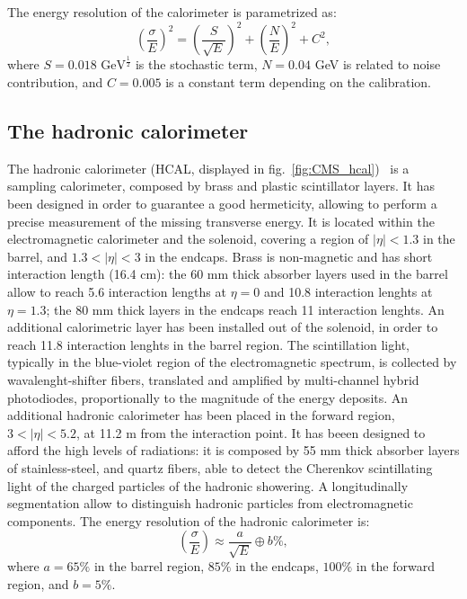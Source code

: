 \noindent The energy resolution of the calorimeter is parametrized as:
\begin{equation}
{\left( \frac{\sigma}{E} \right)}^2 = {\left( \frac{S}{\sqrt{E}} \right)}^2 + {\left( \frac{N}{E} \right)}^2 + C^2,
\end{equation}
where $S=0.018 \text{ GeV}^{\frac{1}{2}}$ is the stochastic term, $N=0.04$ GeV is related to noise contribution, and $C=0.005$ is a constant term depending on the calibration.


\subsection{The hadronic calorimeter}
The hadronic calorimeter (HCAL, displayed in fig.~\ref{fig:CMS_hcal})~\cite{HCAL-TDR} is a sampling calorimeter, composed by brass and plastic scintillator layers. It has been designed in order to guarantee a good hermeticity, allowing to perform a precise measurement of the missing transverse energy. It is located within the electromagnetic calorimeter and the solenoid, covering a region of $|\eta|<1.3$ in the barrel, and $1.3<|\eta|<3$ in the endcaps. Brass is non-magnetic and has short interaction length (16.4 cm): the 60 mm thick absorber layers used in the barrel allow to reach 5.6 interaction lengths at $\eta=0$ and 10.8 interaction lenghts at $\eta = 1.3$; the 80 mm thick layers in the endcaps reach 11 interaction lenghts. An additional calorimetric layer has been installed out of the solenoid, in order to reach 11.8 interaction lenghts in the barrel region. The scintillation light, typically in the blue-violet region of the electromagnetic spectrum, is collected by wavalenght-shifter fibers, translated and amplified by multi-channel hybrid photodiodes, proportionally to the magnitude of the energy deposits. An additional hadronic calorimeter has been placed in the forward region, $3 < |\eta| < 5.2$, at 11.2 m from the interaction point. It has beeen designed to afford the high levels of radiations: it is composed by 55 mm thick absorber layers of stainless-steel, and quartz fibers, able to detect the Cherenkov scintillating light of the charged particles of the hadronic showering. A longitudinally segmentation allow to distinguish hadronic particles from electromagnetic components.
The energy resolution of the hadronic calorimeter is:
\begin{equation}
\left( \frac{\sigma}{E} \right) \approx \frac{a}{\sqrt{E}} \oplus b\%,
\end{equation}
where $a=65\%$ in the barrel region, $85\%$ in the endcaps, $100\%$ in the forward region, and $b=5\%$.

